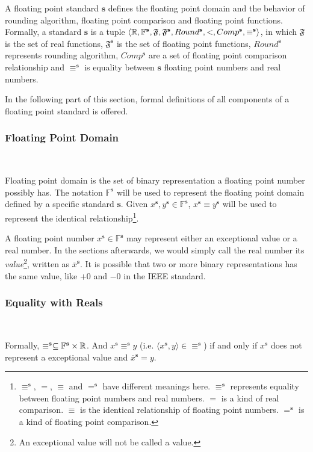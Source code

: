 \documentclass[12pt]{article}
\newcommand{\F}{\mathbb{F}}
\newcommand{\s}{\mathbf{s}}
\newcommand{\OL}{\overline}
\begin{document}
\begin{definition}
A floating point standard $\s$ defines the floating point domain and the behavior of rounding algorithm, floating point comparison and floating point functions. Formally, a standard $\s$ is a tuple $\langle \R, \F^\s, \mathfrak{F}, \mathfrak{F}^\s, Round^\s, <, Comp^\s, \equiv^\s \rangle$, in which $\mathfrak{F}$ is the set of real functions, $\mathfrak{F}^\s$ is the set of floating point functions, $Round^\s$ represents rounding algorithm, $Comp^\s$ are a set of floating point comparison relationship and $\equiv^\s$ is equality between $\s$ floating point numbers and real numbers.
\end{definition}

In the following part of this section, formal definitions of all components of a floating point standard is offered.

\subsubsection{Floating Point Domain} \

Floating point domain is the set of binary representation a floating point number possibly has. The notation $\F^\s$ will be used to represent the floating point domain defined by a specific standard $\s$. Given $x^\s, y^\s \in \F^\s$, $x^\s \equiv y^\s$ will be used to represent the identical relationship\footnote{$\equiv^\s$, $=$, $\equiv$ and $=^\s$ have different meanings here. $\equiv^\s$ represents equality between floating point numbers and real numbers. $=$ is a kind of real comparison. $\equiv$ is the identical relationship of floating point numbers. $=^\s$ is a kind of floating point comparison.}.

A floating point number $x^\s \in \F ^\s$ may represent either an exceptional value or a real number. In the sections afterwards, we would simply call the real number its \emph{value}\footnote{An exceptional value will not be called a value.}, written as $\OL x^\s$. It is possible that two or more binary representations has the same value, like $+0$ and $-0$ in the IEEE standard.

\subsubsection{Equality with Reals} \

Formally, $\equiv^\s \subseteq \F^\s \times \R$. And $x^\s \equiv^\s y$ (i.e. $\langle x^\s, y \rangle \in \equiv^\s$) if and only if $x^\s$ does not represent a exceptional value and $\OL x^\s= y$.
\end{document}
